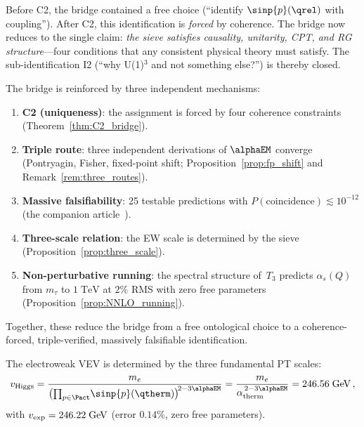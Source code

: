 \documentclass[12pt,a4paper]{article}
\begin{document}
\begin{remark}
\label{rem:C2_reduction}
Before C2, the bridge contained a free choice (``identify
$\sinp{p}(\qrel)$ with coupling'').  After C2, this
identification is \emph{forced} by coherence.  The bridge now
reduces to the single claim: \emph{the sieve satisfies
causality, unitarity, CPT, and RG structure}---four conditions
that any consistent physical theory must satisfy.
The sub-identification I2 (``why U(1)$^3$ and not something
else?'') is thereby closed.
\end{remark}

\begin{remark}
\label{rem:bridge_summary}
The bridge is reinforced by three independent mechanisms:
\begin{enumerate}[nosep]
\item \textbf{C2 (uniqueness)}: the assignment is forced by
  four coherence constraints (Theorem~\ref{thm:C2_bridge}).
\item \textbf{Triple route}: three independent derivations of
  $\alphaEM$ converge (Pontryagin, Fisher, fixed-point shift;
  Proposition~\ref{prop:fp_shift} and Remark~\ref{rem:three_routes}).
\item \textbf{Massive falsifiability}: 25 testable predictions
  with $P(\text{coincidence}) \lesssim 10^{-12}$
  (the companion article~\cite{companion_physics}).
\item \textbf{Three-scale relation}: the EW scale is determined
  by the sieve (Proposition~\ref{prop:three_scale}).
\item \textbf{Non-perturbative running}: the spectral structure
  of~$T_3$ predicts $\alpha_s(Q)$ from $m_\tau$ to $1\;\mathrm{TeV}$
  at $2\%$ RMS with zero free parameters
  (Proposition~\ref{prop:NNLO_running}).
\end{enumerate}
Together, these reduce the bridge from a free ontological choice to
a coherence-forced, triple-verified, massively falsifiable
identification.
\end{remark}

\begin{proposition}
\label{prop:three_scale}
The electroweak VEV is determined by the three fundamental PT
scales:
\begin{equation}
  v_{\rm Higgs}
  = \frac{m_e}
         {\bigl(\prod_{p\in\Pact}\!\sinp{p}(\qtherm)\bigr)^{\!2 - 3\alphaEM}}
  = \frac{m_e}{\alpha_{\rm therm}^{\,2 - 3\alphaEM}}
  = 246.56\;\mathrm{GeV}\,,
  \label{eq:three_scale}
\end{equation}
with $v_{\rm exp} = 246.22\;\mathrm{GeV}$ (error $0.14\%$, zero
free parameters).
\end{proposition}
\end{document}
